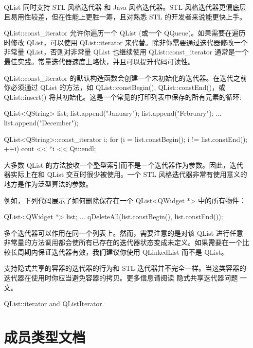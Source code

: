 QList 同时支持 STL 风格迭代器 和 Java 风格迭代器。STL 风格迭代器更偏底层且易用性较差，但在性能上更胜一筹，且对熟悉 STL 的开发者来说能更快上手。

QList::const\_iterator 允许你遍历一个 QList (或一个 QQueue)。如果需要在遍历时修改 QList，可以使用 QList::iterator 来代替。除非你需要通过迭代器修改一个非常量 QList，否则对非常量 QList 也继续使用 QList::const\_iterator 通常是一个最佳实践。常量迭代器速度上略快，并且可以提升代码可读性。

QList::const\_iterator 的默认构造函数会创建一个未初始化的迭代器。在迭代之前你必须通过 QList 的方法，如 QList::constBegin(), QList::constEnd()，或 QList::insert() 将其初始化。这是一个常见的打印列表中保存的所有元素的循环:

\begin{cppcode}
QList<QString> list;
list.append("January");
list.append("February");
...
list.append("December");

QList<QString>::const_iterator i;
for (i = list.constBegin(); i != list.constEnd(); ++i)
    cout << *i << Qt::endl;
\end{cppcode}

大多数 QList 的方法接收一个整型索引而不是一个迭代器作为参数。因此，迭代器实际上在和 QList 交互时很少被使用。一个 STL 风格迭代器非常有使用意义的地方是作为泛型算法的参数。

例如，下列代码展示了如何删除保存在一个 QList<QWidget *> 中的所有物件：


\begin{cppcode}
QList<QWidget *> list;
...
qDeleteAll(list.constBegin(), list.constEnd());
\end{cppcode}


多个迭代器可以作用在同一个列表上。然而，需要注意的是对该 QList 进行任意非常量的方法调用都会使所有已存在的迭代器状态变成未定义。如果需要在一个比较长周期内保证迭代器有效，我们建议你使用 QLinkedList 而不是 QList。

\begin{warning}
支持隐式共享的容器的迭代器的行为和 STL 迭代器并不完全一样。当这类容器的迭代器在使用时你应当避免容器的拷贝。更多信息请阅读 隐式共享迭代器问题 一文。
\end{warning}

\begin{seeAlso}
QList::iterator and QListIterator.
\end{seeAlso}

\section{成员类型文档}

